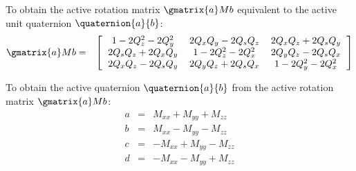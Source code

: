 \documentclass{book}
\numberwithin{equation}{subsection}
\begin{document}
To obtain the active rotation matrix $\gmatrix{a}M{b}$ equivalent to
the active unit quaternion $\quaternion{a}{b}$:
\begin{eqnarray}
\gmatrix{a}M{b} &=&
    \left[
        \begin{tabular}{ccc}
            $1 - 2 Q_z^2 - 2 Q_y^2$ &
            $2 Q_x Q_y - 2 Q_s Q_z$ &
            $2 Q_x Q_z + 2 Q_s Q_y$ \\
            $2 Q_s Q_z + 2 Q_x Q_y$ &
            $1 - 2 Q_z^2 - 2 Q_x^2$ &
            $2 Q_y Q_z - 2 Q_s Q_x$ \\
            $2 Q_x Q_z - 2 Q_s Q_y$ &
            $2 Q_y Q_z + 2 Q_s Q_x$ &
            $1 - 2 Q_y^2 - 2 Q_x^2$
        \end{tabular}
    \right] \nonumber
    \label{eqn:quat_to_rot_mat} \\
\end{eqnarray}

To obtain the active quaternion $\quaternion{a}{b}$ from the active
rotation matrix $\gmatrix{a}M{b}$:
\begin{eqnarray}
a &=& M_{xx} + M_{yy} + M_{zz} \nonumber \label{eqn:rot_mat_to_quat} \\
b &=& M_{xx} - M_{yy} - M_{zz} \nonumber\\
c &=& - M_{xx} + M_{yy} - M_{zz} \nonumber\\
d &=& - M_{xx} - M_{yy} + M_{zz}
\end{eqnarray}
\end{document}
